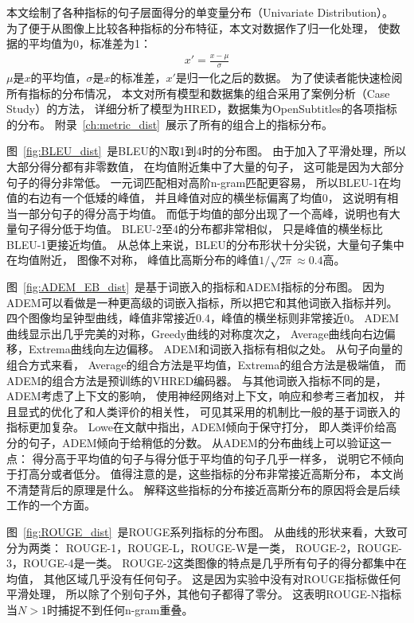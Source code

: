 本文绘制了各种指标的句子层面得分的单变量分布（Univariate Distribution）。
为了便于从图像上比较各种指标的分布特征，本文对数据作了归一化处理，
使数据的平均值为0，标准差为1：
\begin{align}
    x' = \frac{x - \mu}{\sigma}
\end{align}
$\mu$是$x$的平均值，$\sigma$是$x$的标准差，$x'$是归一化之后的数据。
为了使读者能快速检阅所有指标的分布情况，
本文对所有模型和数据集的组合采用了案例分析（Case Study）的方法，
详细分析了模型为HRED，数据集为OpenSubtitles的各项指标的分布。
附录~\ref{ch:metric_dist}~展示了所有的组合上的指标分布。


图~\ref{fig:BLEU_dist}~是BLEU的N取1到4时的分布图。
由于加入了平滑处理，所以大部分得分都有非零数值，
在均值附近集中了大量的句子，
这可能是因为大部分句子的得分非常低。
一元词匹配相对高阶n-gram匹配更容易，
所以BLEU-1在均值的右边有一个低矮的峰值，
并且峰值对应的横坐标偏离了均值0，
这说明有相当一部分句子的得分高于均值。
而低于均值的部分出现了一个高峰，说明也有大量句子得分低于均值。
BLEU-2至4的分布都非常相似，
只是峰值的横坐标比BLEU-1更接近均值。
从总体上来说，BLEU的分布形状十分尖锐，大量句子集中在均值附近，
图像不对称， 峰值比高斯分布的峰值$1 / \sqrt{2 \pi} \approx 0.4$高。


图~\ref{fig:ADEM_EB_dist}~是基于词嵌入的指标和ADEM指标的分布图。
因为ADEM可以看做是一种更高级的词嵌入指标，所以把它和其他词嵌入指标并列。
四个图像均呈钟型曲线，峰值非常接近0.4，峰值的横坐标则非常接近0。
ADEM曲线显示出几乎完美的对称，Greedy曲线的对称度次之，
Average曲线向右边偏移，Extrema曲线向左边偏移。
ADEM和词嵌入指标有相似之处。
从句子向量的组合方式来看，
Average的组合方法是平均值，Extrema的组合方法是极端值，
而ADEM的组合方法是预训练的VHRED编码器。
与其他词嵌入指标不同的是，ADEM考虑了上下文的影响，
使用神经网络对上下文，响应和参考三者加权，
并且显式的优化了和人类评价的相关性，
可见其采用的机制比一般的基于词嵌入的指标更加复杂。
Lowe在文献\cite{ADEM}中指出，ADEM倾向于保守打分，
即人类评价给高分的句子，ADEM倾向于给稍低的分数。
从ADEM的分布曲线上可以验证这一点：
得分高于平均值的句子与得分低于平均值的句子几乎一样多，
说明它不倾向于打高分或者低分。
值得注意的是，这些指标的分布非常接近高斯分布，
本文尚不清楚背后的原理是什么。
解释这些指标的分布接近高斯分布的原因将会是后续工作的一个方面。


图~\ref{fig:ROUGE_dist}~是ROUGE系列指标的分布图。
从曲线的形状来看，大致可分为两类：
ROUGE-1，ROUGE-L，ROUGE-W是一类，
ROUGE-2，ROUGE-3，ROUGE-4是一类。
ROUGE-2这类图像的特点是几乎所有句子的得分都集中在均值，
其他区域几乎没有任何句子。
这是因为实验中没有对ROUGE指标做任何平滑处理，
所以除了个别句子外，其他句子都得了零分。
这表明ROUGE-N指标当$N > 1$时捕捉不到任何n-gram重叠。

